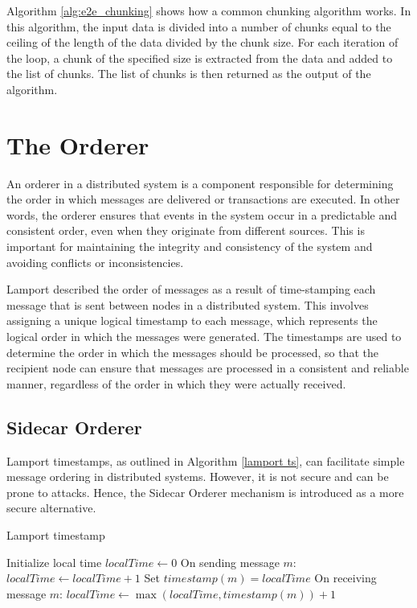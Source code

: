 \documentclass[twocolumn]{article}
\begin{document}
Algorithm \ref{alg:e2e_chunking} shows how a common chunking algorithm works. In this algorithm, the input data is divided into a number of chunks equal to the ceiling of the length of the data divided by the chunk size. For each iteration of the loop, a chunk of the specified size is extracted from the data and added to the list of chunks. The list of chunks is then returned as the output of the algorithm.

\section{The Orderer}

An orderer in a distributed system is a component responsible for determining the order in which messages are delivered or transactions are executed. In other words, the orderer ensures that events in the system occur in a predictable and consistent order, even when they originate from different sources. This is important for maintaining the integrity and consistency of the system and avoiding conflicts or inconsistencies.

Lamport described the order of messages as a result of time-stamping each message that is sent between nodes in a distributed system. This involves assigning a unique logical timestamp to each message, which represents the logical order in which the messages were generated. The timestamps are used to determine the order in which the messages should be processed, so that the recipient node can ensure that messages are processed in a consistent and reliable manner, regardless of the order in which they were actually received.

\subsection{Sidecar Orderer}

Lamport timestamps, as outlined in Algorithm \ref{lamport ts}, can facilitate simple message ordering in distributed systems. However, it is not secure and can be prone to attacks. Hence, the Sidecar Orderer mechanism is introduced as a more secure alternative.

\begin{algorithm}[h]
\caption{Lamport timestamp}
\label{lamport ts}
\begin{algorithmic}[1]
\State Initialize local time $localTime \gets 0$
\State On sending message $m$:
\State \quad $localTime \gets localTime + 1$
\State \quad Set $timestamp(m) = localTime$
\State On receiving message $m$:
\State \quad $localTime \gets \max(localTime, timestamp(m)) + 1$
\end{algorithmic}
\end{algorithm}
\end{document}
